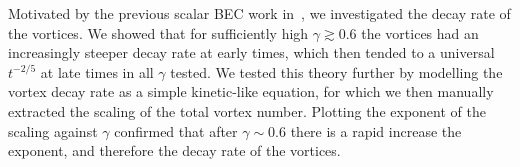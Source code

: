 Motivated by the previous scalar BEC work in~\cite{Karl2017}, we investigated
the decay rate of the vortices.
We showed that for sufficiently high \(\gamma \gtrsim 0.6\) the vortices had an
increasingly steeper decay rate at early times, which then tended to a universal
\(t^{-2/5}\) at late times in all \(\gamma \) tested.
We tested this theory further by modelling the vortex decay rate as a simple
kinetic-like equation, for which we then manually extracted the scaling of
the total vortex number.
Plotting the exponent of the scaling against \(\gamma \) confirmed that after
\(\gamma \sim 0.6\) there is a rapid increase the exponent, and therefore the
decay rate of the vortices.